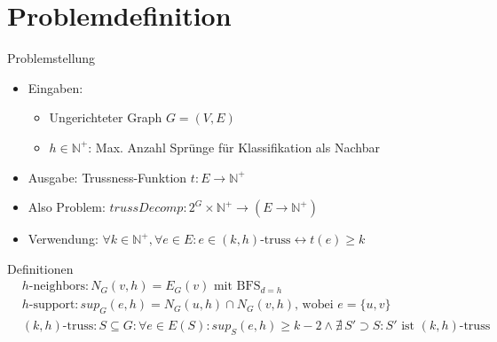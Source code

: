 \section{Problemdefinition}

\begin{frame}{Problemstellung}
    \begin{itemize}
        \item Eingaben:
        \begin{itemize}
            \item Ungerichteter Graph $G = (V,E)$
            \item $h \in \mathbb{N}^+$: Max. Anzahl Sprünge für Klassifikation als Nachbar
        \end{itemize}
        \item Ausgabe: Trussness-Funktion $t: E \rightarrow \mathbb{N}^+$
        \item Also Problem: $trussDecomp: 2^G \times \mathbb{N}^+ \rightarrow (E \rightarrow \mathbb{N}^+)$
        \item Verwendung: $\forall k \in \mathbb{N}^+, \forall e \in E: e \in \text{$(k,h)$-truss} \leftrightarrow t(e) \geq k$
    \end{itemize}
\end{frame}

\begin{frame}{Definitionen}
    \begin{align*}
        &\hspace{0pt} \text{$h$-neighbors}: N_G(v,h) = E_G(v) \text{ mit BFS}_{d=h}  \\
        &\hspace{0pt} \text{$h$-support}: sup_G(e, h) = N_G(u,h) \cap N_G(v,h) \text{, wobei } e = \{u,v\} \\
        &\hspace{0pt} \text{$(k,h)$-truss}: S \subseteq G: \forall e \in E(S): sup_{S}(e,h) \geq k - 2 \land \nexists \, S' \supset S: S' \text{ ist } \text{$(k,h)$-truss} \\
    \end{align*}
\end{frame}
